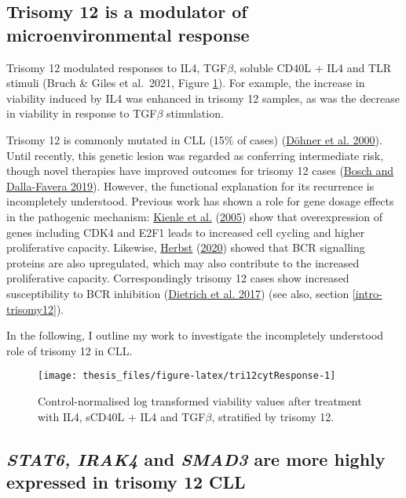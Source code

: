 \documentclass[11pt, a4paper, twosided]{book}
\begin{document}
\hypertarget{trisomy12-modulator}{%
\subsection{Trisomy 12 is a modulator of microenvironmental response}\label{trisomy12-modulator}}

Trisomy 12 modulated responses to IL4, TGF\(\beta\), soluble CD40L + IL4 and TLR stimuli (Bruch \& Giles et al.~2021, Figure \ref{fig:tri12cytResponse}). For example, the increase in viability induced by IL4 was enhanced in trisomy 12 samples, as was the decrease in viability in response to TGF\(\beta\) stimulation.

Trisomy 12 is commonly mutated in CLL (15\% of cases) (\protect\hyperlink{ref-Dohner2000}{Döhner et al. 2000}). Until recently, this genetic lesion was regarded as conferring intermediate risk, though novel therapies have improved outcomes for trisomy 12 cases (\protect\hyperlink{ref-Bosch2019}{Bosch and Dalla-Favera 2019}). However, the functional explanation for its recurrence is incompletely understood. Previous work has shown a role for gene dosage effects in the pathogenic mechanism: \protect\hyperlink{ref-Kienle2005}{Kienle et al.} (\protect\hyperlink{ref-Kienle2005}{2005}) show that overexpression of genes including CDK4 and E2F1 leads to increased cell cycling and higher proliferative capacity. Likewise, \protect\hyperlink{ref-HerbstThesis}{Herbst} (\protect\hyperlink{ref-HerbstThesis}{2020}) showed that BCR signalling proteins are also upregulated, which may also contribute to the increased proliferative capacity. Correspondingly trisomy 12 cases show increased susceptibility to BCR inhibition (\protect\hyperlink{ref-JCIpaper}{Dietrich et al. 2017}) (see also, section \ref{intro-trisomy12}).

In the following, I outline my work to investigate the incompletely understood role of trisomy 12 in CLL.


\begin{figure}

{\centering \texttt{[image: thesis\_files/figure-latex/tri12cytResponse-1]} 

}

\caption{Control-normalised log transformed viability values after treatment with IL4, sCD40L + IL4 and TGF\(\beta\), stratified by trisomy 12.}\label{fig:tri12cytResponse}
\end{figure}
\hypertarget{gene-dosage-effects}{%
\subsection{\texorpdfstring{\emph{STAT6, IRAK4} and \emph{SMAD3} are more highly expressed in trisomy 12 CLL}{STAT6, IRAK4 and SMAD3 are more highly expressed in trisomy 12 CLL}}\label{gene-dosage-effects}}
\end{document}
